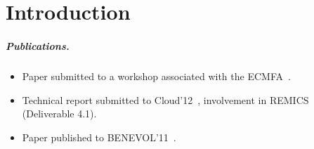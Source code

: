 \chapter{Introduction}


\paragraph{Publications.}

\begin{itemize}
  \item
    Paper submitted to a workshop associated with the ECMFA~\cite{ecmfa4clouda}.
  \item
    Technical report submitted to Cloud'12~\cite{remics_4_1}, 
    involvement in REMICS (Deliverable 4.1).
  \item
    Paper published to BENEVOL'11~\cite{mosser-brandtzæg-etal:2011}.
\end{itemize}
